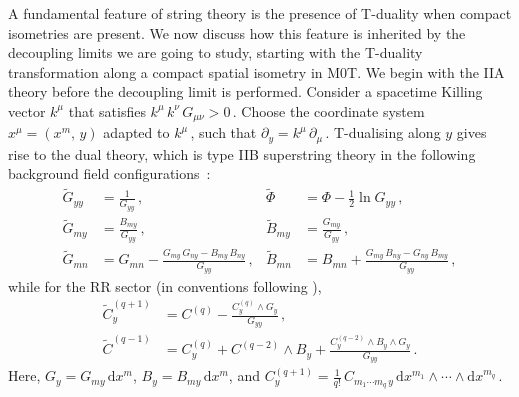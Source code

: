 \documentclass[11pt]{article}
\newcommand{\p}{\partial}
\renewcommand{\tilde}[1]{\widetilde{#1}}
\newcommand{\dd}{\mathrm{d}}
\begin{document}
A fundamental feature of string theory is the presence of T-duality when compact isometries are present.
We now discuss how this feature is inherited by the decoupling limits we are going to study, starting with the T-duality transformation along a compact spatial isometry in M0T. We begin with the IIA theory before the decoupling limit is performed. Consider a spacetime Killing vector $k^\mu$ that satisfies $k^\mu \, k^\nu \, G_{\mu\nu} > 0$\,. Choose the coordinate system $x^\mu = (x^m, \, y)$ adapted to $k^\mu$\,, such that $\p_y = k^\mu \, \p_\mu$\,. T-dualising along $y$ gives rise to the dual theory, which is type IIB superstring theory in the following background field configurations~\cite{Buscher:1987sk, Buscher:1987qj}:
%
\begin{subequations} \label{eq:ubrs}
\begin{align}
    \tilde{G}_{yy} & = \frac{1}{G_{yy}}\,, 
        &
    \tilde{\Phi} & = \Phi - \tfrac{1}{2} \ln G_{yy}\,, \\[4pt]
    \tilde{G}_{my} & = \frac{B_{my}}{G_{yy}}\,, 
        &
    \tilde{B}_{my} & = \frac{G_{my}}{G_{yy}}\,, \\[4pt]
    \tilde{G}_{mn} & = G_{mn} - \frac{G_{my} \, G_{ny} - B_{my} \, B_{ny}}{G_{yy}}\,, 
        &
    \tilde{B}_{mn} & = B_{mn} + \frac{G_{my} \, B_{ny} - G_{ny} \, B_{my}}{G_{yy}}\,,
\end{align}
\end{subequations}
%
while for the RR sector \cite{Bergshoeff:1995as} (in conventions following \cite{Ebert:2021mfu}),
%
\begin{subequations}
\begin{align}
    \tilde{C}^{(q+1)}_y & = C^{(q)} - \frac{C^{(q)}_y \wedge G_y}{G_{yy}}\,, \\[4pt]
    \tilde{C}^{(q-1)} & = C^{(q)}_y + C^{(q-2)} \wedge B_y + \frac{C^{(q-2)}_y \wedge B_y \wedge G_y}{G_{yy}}\,. 
\end{align}
\end{subequations}
%
Here, $G_y = G_{my} \, \dd x^m$, $B_y = B_{my} \, \dd x^m$, and $C^{(q+1)}_y = \frac{1}{q!} \, C^{}_{m_1\cdots m_q \, y} \, \dd x^{m_1} \wedge \cdots \wedge \dd x^{m_q}$\,. 
\end{document}
